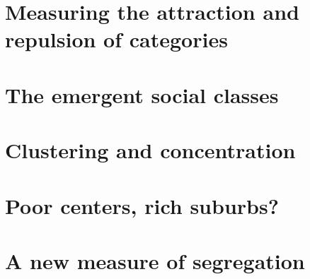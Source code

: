
\section{Measuring the attraction and repulsion of categories}
\label{sec:measuring_the_attraction_and_repulsion_of_categories}

\section{The emergent social classes}
\label{sec:the_emergent_social_classes}

\section{Clustering and concentration}
\label{sec:clustering_and_concentration}

\section{Poor centers, rich suburbs?}
\label{sec:poor_centers_rich_suburbs_}

\section{A new measure of segregation}
\label{sec:a_new_measure_of_segregation}
